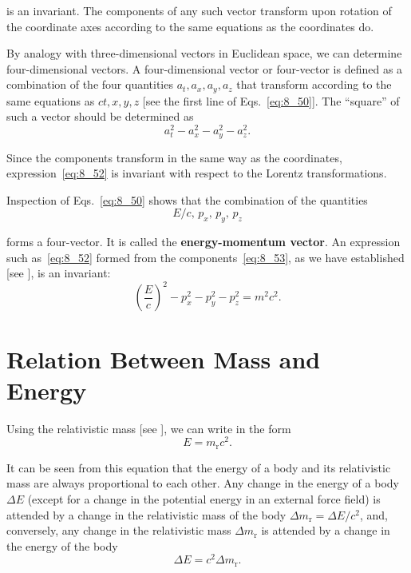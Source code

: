 \noindent
is an invariant. The components of any such vector transform upon rotation of the coordinate axes according to the same equations as the coordinates do.

By analogy with three-dimensional vectors in Euclidean space, we can determine four-dimensional vectors. A four-dimensional vector or four-vector is defined as a combination of the four quantities $a_t, a_x, a_y, a_z$ that transform according to the same equations as $ct, x, y, z$ [see the first line of Eqs.~\eqref{eq:8_50}]. The ``square'' of such a vector should be determined as
\begin{equation}\label{eq:8_52}
	a_t^2 - a_x^2 - a_y^2 - a_z^2.
\end{equation}

\noindent
Since the components transform in the same way as the coordinates, expression~\eqref{eq:8_52} is invariant with respect to the Lorentz transformations.

Inspection of Eqs.~\eqref{eq:8_50} shows that the combination of the quantities
\begin{equation}\label{eq:8_53}
	E/c,\, p_x,\, p_y,\, p_z
\end{equation}

\noindent
forms a four-vector. It is called the \textbf{energy-momentum vector}. An expression such as~\eqref{eq:8_52} formed from the components~\eqref{eq:8_53}, as we have established [see ], is an invariant:
\begin{equation*}
	\left(\frac{E}{c}\right)^2 - p_x^2 - p_y^2 - p_z^2 = m^2c^2.
\end{equation*}

\section{Relation Between Mass and Energy}\label{sec:8_9}

Using the relativistic mass [see ], we can write  in the form
\begin{equation}\label{eq:8_54}
	E = m_{\text{r}}c^2.
\end{equation}

\noindent
It can be seen from this equation that the energy of a body and its relativistic mass are always proportional to each other. Any change in the energy of a body $\Delta E$ (except for a change in the potential energy in an external force field) is attended by a change in the relativistic mass of the body $\Delta m_{\text{r}} = \Delta E/c^2$, and, conversely, any change in the relativistic mass $\Delta m_{\text{r}}$ is attended by a change in the energy of the body 
\begin{equation}\label{eq:8_55}
	\Delta E = c^2 \Delta m_{\text{r}}.
\end{equation}

